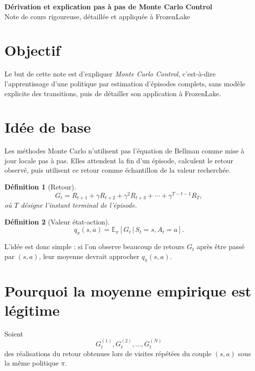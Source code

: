 \documentclass[11pt,a4paper]{article}
\newtheorem*{definition}{Définition}
\newcommand{\E}{\mathbb{E}}
\newcommand{\given}{\,|\,}
\begin{document}
\begin{center}
    {\LARGE\bfseries Dérivation et explication pas à pas de Monte Carlo Control}\\[0.4em]
    {\large Note de cours rigoureuse, détaillée et appliquée à FrozenLake}
\end{center}

\vspace{0.6em}

\section{Objectif}

Le but de cette note est d'expliquer \emph{Monte Carlo Control}, c'est-à-dire l'apprentissage d'une politique par estimation d'épisodes complets, sans modèle explicite des transitions, puis de détailler son application à FrozenLake.

\section{Idée de base}

Les méthodes Monte Carlo n'utilisent pas l'équation de Bellman comme mise à jour locale pas à pas. Elles attendent la fin d'un épisode, calculent le retour observé, puis utilisent ce retour comme échantillon de la valeur recherchée.

\begin{definition}[Retour]
\[
G_t = R_{t+1}+\gamma R_{t+2}+\gamma^2 R_{t+3}+\cdots+\gamma^{T-t-1}R_T,
\]
où $T$ désigne l'instant terminal de l'épisode.
\end{definition}

\begin{definition}[Valeur état-action]
\[
q_{\pi}(s,a)=\E_{\pi}[G_t \given S_t=s,A_t=a].
\]
\end{definition}

L'idée est donc simple : si l'on observe beaucoup de retours $G_t$ après être passé par $(s,a)$, leur moyenne devrait approcher $q_{\pi}(s,a)$.

\section{Pourquoi la moyenne empirique est légitime}

Soient
\[
G_t^{(1)},G_t^{(2)},\dots,G_t^{(N)}
\]
des réalisations du retour obtenues lors de visites répétées du couple $(s,a)$ sous la même politique $\pi$.
\end{document}
